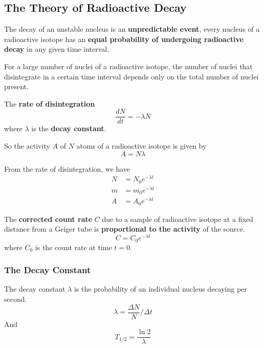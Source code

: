 \subsection{The Theory of Radioactive Decay}

The decay of an unstable nucleus is an \textbf{unpredictable event}, every nucleus of a radioactive isotope has an \textbf{equal probability of undergoing radioactive decay} in any given time interval.

For a large number of nuclei of a radioactive isotope, the number of nuclei that disintegrate in a certain time interval depends only on the total number of nuclei present.

The \textbf{rate of disintegration}
$$\frac{dN}{dt}=-\lambda N$$
where $\lambda$ is the \textbf{decay constant}.

So the activity $A$ of $N$ atoms of a radioactive isotope is given by
$$A=N\lambda$$

From the rate of disintegration, we have
\begin{align*}
    N&=N_0e^{-\lambda t}\\
    m&=m_0e^{-\lambda t}\\
    A&=A_0e^{-\lambda t}
\end{align*}

The \textbf{corrected count rate} $C$ due to a sample of radioactive isotope at a fixed distance from a Geiger tube is \textbf{proportional to the activity} of the source.
$$C=C_0e^{-\lambda t}$$
where $C_0$ is the count rate at time $t=0$.

\subsubsection*{The Decay Constant}

The decay constant $\lambda$ is the probability of an individual nucleus decaying per second.
$$\lambda=\frac{\Delta N}{N}/\Delta t$$
And
$$T_{1/2}=\frac{\ln 2}{\lambda}$$
